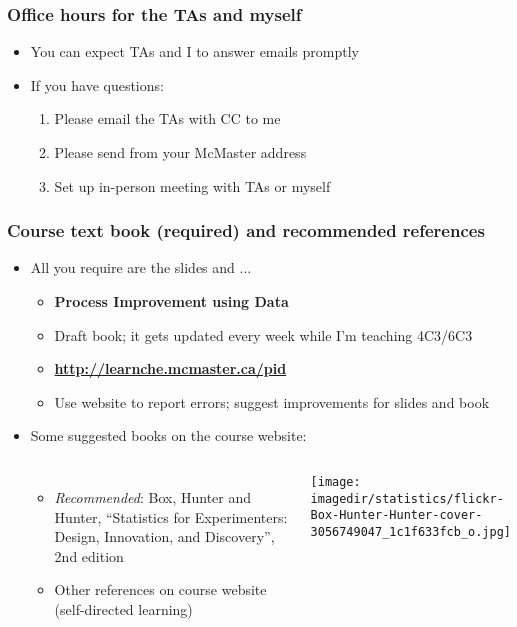 \begin{frame}\frametitle{Office hours for the TAs and myself}
	\begin{itemize}
		\item	You can expect TAs and I to answer emails promptly
		\item	If you have questions:
		\begin{enumerate}
			\item	Please email the TAs with CC to me \hfill {\tiny{\color{myOrange}{$\longleftarrow$ hopefully this solves your problem}}}
			\item	Please send from your McMaster address
			\item	Set up in-person meeting with TAs or myself
		\end{enumerate}
	\end{itemize}
\end{frame}

\begin{frame}\frametitle{Course text book (required) and recommended references}
	\begin{itemize}
		\item	All you require are the slides and ...
		\begin{itemize}
			\item	\textbf{Process Improvement using Data}
			\item	Draft book; it gets updated every week while I'm teaching 4C3/6C3
			\item	\textbf{\href{http://learnche.mcmaster.ca/pid}{http://learnche.mcmaster.ca/pid}}
			\item	Use website to report errors; suggest improvements for slides and book
		\end{itemize}
	\end{itemize}
	
	\begin{itemize}
		\item	Some suggested books on the course website:
		\begin{columns}[t]
				\begin{itemize}
					\item	\emph{Recommended}: Box, Hunter and Hunter, ``Statistics for Experimenters: Design, Innovation, and Discovery'', 2nd edition
					\item	Other references on course website (self-directed learning)
				\end{itemize}
				\vspace{-1cm}
				\begin{center}
					\texttt{[image: \\imagedir/statistics/flickr-Box-Hunter-Hunter-cover-3056749047\_1c1f633fcb\_o.jpg]}
				\end{center}
		\end{columns}
	\end{itemize}
\end{frame}

